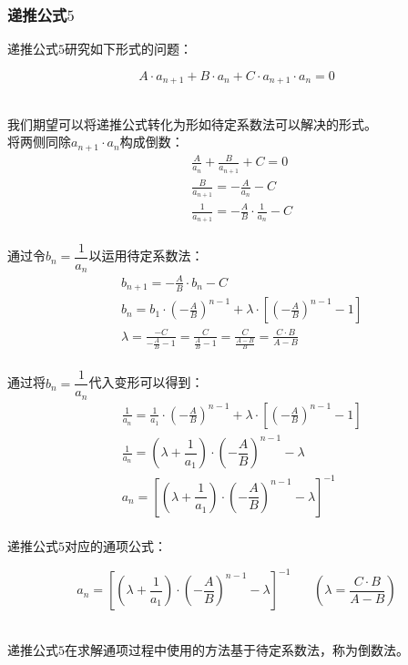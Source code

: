 \documentclass[UTF8]{ctexart}
\begin{document}
\newpage

\subsubsection{递推公式$5$}
    \setcounter{equation}{0}
    递推公式$5$研究如下形式的问题：
    \begin{large}
        \begin{equation*}
            A\cdot a_{n+1}+B\cdot a_n+C\cdot a_{n+1}\cdot a_n=0
        \end{equation*}
    \end{large}\\
    我们期望可以将递推公式转化为形如待定系数法可以解决的形式。\\[3mm]
    将两侧同除$a_{n+1}\cdot a_n$构成倒数：
    \begin{align}
        &\frac{A}{a_n}+\frac{B}{a_{n+1}}+C=0\\[3mm]
        &\frac{B}{a_{n+1}}=-\frac{A}{a_n}-C\\[3mm]
        &\frac{1}{a_{n+1}}=-\frac{A}{B}\cdot\frac{1}{a_n}-C
    \end{align}\\
    通过令$b_n=\dfrac{1}{a_n}$以运用待定系数法：
    \begin{align}
        &b_{n+1}=-\frac{A}{B}\cdot b_n-C\\[3mm]
        &b_{n}=b_1\cdot\left(-\frac{A}{B}\right)^{n-1}+\lambda\cdot\left[\left(-\frac{A}{B}\right)^{n-1}-1\right]\\[3mm]
        &\lambda=\frac{-C}{-\frac{A}{B}-1}=\frac{C}{\frac{A}{B}-1}=\frac{C}{\frac{A-B}{B}}=\frac{C\cdot B}{A-B}
    \end{align}\\
    通过将$b_n=\dfrac{1}{a_n}$代入变形可以得到：
    \begin{align}
        &\frac{1}{a_n}=\frac{1}{a_1}\cdot\left(-\frac{A}{B}\right)^{n-1}+\lambda\cdot\left[\left(-\frac{A}{B}\right)^{n-1}-1\right]\\[3mm]
        &\frac{1}{a_n}=\left(\lambda+\dfrac{1}{a_1}\right)\cdot\left(-\dfrac{A}{B}\right)^{n-1}-\lambda\\[3mm]
        &a_n=\left[\left(\lambda+\dfrac{1}{a_1}\right)\cdot\left(-\dfrac{A}{B}\right)^{n-1}-\lambda\right]^{-1}
    \end{align}\\
    递推公式$5$对应的通项公式：
    \begin{large}
        \begin{equation*}
            a_n=\left[\left(\lambda+\dfrac{1}{a_1}\right)\cdot\left(-\dfrac{A}{B}\right)^{n-1}-\lambda\right]^{-1}~~~~~~~~\left(\lambda=\frac{C\cdot B}{A-B}\right)
        \end{equation*}
    \end{large}\\
    递推公式$5$在求解通项过程中使用的方法基于待定系数法，称为倒数法。
\end{document}

